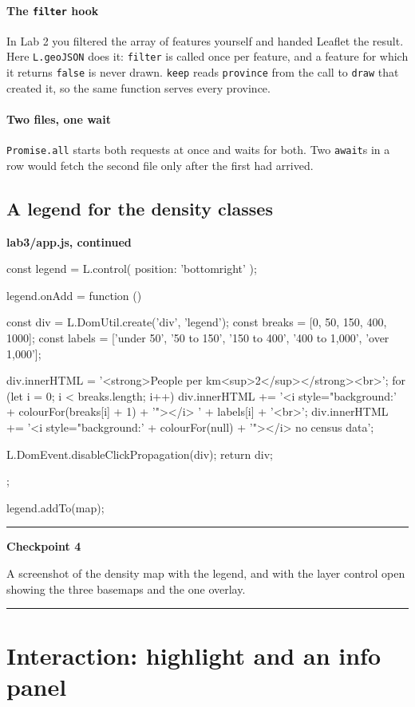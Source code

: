\documentclass{article}
\newcommand{\cd}[1]{\texttt{#1}}
\newcommand{\codecap}[1]{%
  \par\vspace{.9em}\noindent\textbf{#1}\par\vspace{-.6em}}
\newenvironment{keypoint}[1]
  {\par\vspace{.7em}\noindent\rule{\linewidth}{.6pt}\par\vspace{.15em}
   \noindent\textbf{#1}\par\nobreak\vspace{-.3em}}
  {\par\vspace{.15em}\noindent\rule{\linewidth}{.6pt}\par\vspace{.7em}}
\begin{document}
\paragraph{The \texttt{filter} hook}
In Lab 2 you filtered the array of features yourself and handed Leaflet
the result. Here \cd{L.geoJSON} does it: \cd{filter} is called once per
feature, and a feature for which it returns \cd{false} is never drawn.
\cd{keep} reads \cd{province} from the call to \cd{draw} that created
it, so the same function serves every province.

\paragraph{Two files, one wait}
\cd{Promise.all} starts both requests at once and waits for both. Two
\cd{await}s in a row would fetch the second file only after the first
had arrived.

\subsection{A legend for the density classes}

\codecap{lab3/app.js, continued}
\begin{code}
const legend = L.control({ position: 'bottomright' });

legend.onAdd = function () {
  const div = L.DomUtil.create('div', 'legend');
  const breaks = [0, 50, 150, 400, 1000];
  const labels = ['under 50', '50 to 150', '150 to 400',
                  '400 to 1,000', 'over 1,000'];

  div.innerHTML = '<strong>People per km<sup>2</sup></strong><br>';
  for (let i = 0; i < breaks.length; i++) {
    div.innerHTML +=
      '<i style="background:' + colourFor(breaks[i] + 1) + '"></i> ' +
      labels[i] + '<br>';
  }
  div.innerHTML +=
    '<i style="background:' + colourFor(null) + '"></i> no census data';

  L.DomEvent.disableClickPropagation(div);
  return div;
};

legend.addTo(map);
\end{code}

\begin{keypoint}{Checkpoint 4}
A screenshot of the density map with the legend, and with the layer
control open showing the three basemaps and the one overlay.
\end{keypoint}


\section{Interaction: highlight and an info panel}
\end{document}
